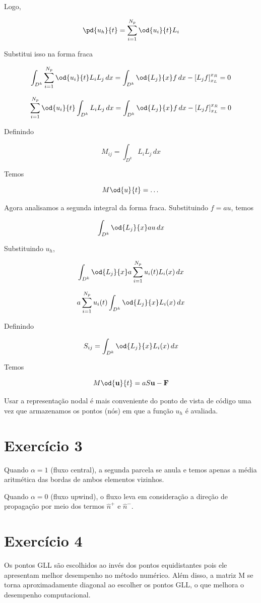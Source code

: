 Logo, 

\[ \pd{u_h}{t} = \sum_{i=1}^{N_p} \od{u_i}{t} L_i \]

Substitui isso na forma fraca

\[ \int_{D^k} \sum_{i=1}^{N_p} \od{u_i}{t} L_i L_j  \, dx = \int_{D^k} \od{L_j}{x} f \, dx - \left[ L_j f \right]_{x_L}^{x_R}  = 0 \]

\[ \sum_{i=1}^{N_p} \od{u_i}{t} \int_{D^k} L_i L_j  \, dx = \int_{D^k} \od{L_j}{x} f \, dx - \left[ L_j f \right]_{x_L}^{x_R}  = 0 \]

Definindo

\[ M_{ij} = \int_{D^k} L_i L_j  \, dx \]

Temos

\[ M \od{u}{t} = \dots \]

Agora analisamos a segunda integral da forma fraca. Substituindo $f = au$, temos 

\[ \int_{D^k} \od{L_j}{x} a u \, dx  \]

Substituindo $u_h$, 

\[ \int_{D^k} \od{L_j}{x} a \sum_{i=1}^{N_p} u_i(t) L_i(x) \, dx  \]

\[ a  \sum_{i=1}^{N_p} u_i(t) \int_{D^k} \od{L_j}{x}  L_i(x) \, dx  \]

Definindo

\[ S_{ij} = \int_{D^k} \od{L_j}{x}  L_i(x) \, dx \]

Temos

\[  M \od{\mathbf{u}}{t} = a S \mathbf{u} - \mathbf{F} \]

Usar a representação nodal é mais conveniente do ponto de vista de código 
uma vez que armazenamos os pontos (nós) em que a função $u_h$ é avaliada.

\section{Exercício 3}

Quando $\alpha = 1$ (fluxo central), a segunda parcela se anula e temos apenas a média aritmética das bordas
de ambos
elementos vizinhos.

Quando $\alpha = 0$ (fluxo upwind), o fluxo leva em consideração a direção de propagação por meio 
dos termos $\hat{n}^+$ e $\hat{n}^-$.

\section{Exercício 4}

Os pontos GLL são escolhidos ao invés dos pontos equidistantes pois 
ele apresentam melhor desempenho no método numérico. 
Além disso, a matriz M se torna aproximadamente diagonal ao escolher
os pontos GLL, o que melhora o desempenho computacional.

